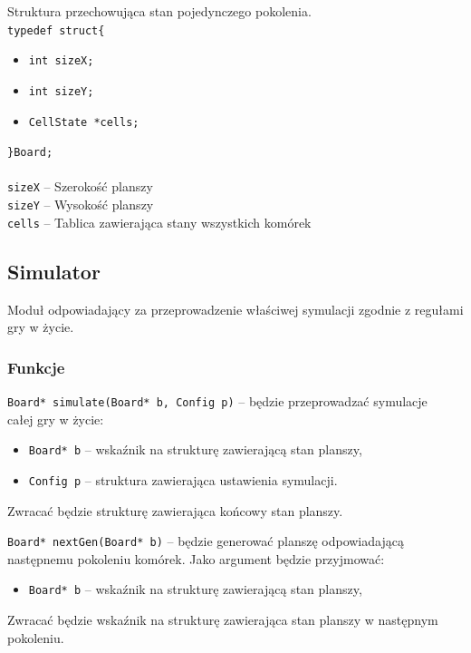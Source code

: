 \documentclass{article}
\begin{document}
\vspace{5mm}

\noindent{}Struktura przechowująca stan pojedynczego pokolenia. \\
\texttt{typedef struct\{}
\begin{itemize}[label={}, noitemsep, topsep=0pt]
	\item \texttt{int sizeX;}
	\item \texttt{int sizeY;}
	\item \texttt{CellState *cells;}
\end{itemize}
\texttt{\}Board;\\} \\
\texttt{sizeX} -- Szerokość planszy \\
\texttt{sizeY} -- Wysokość planszy \\
\texttt{cells} -- Tablica zawierająca stany wszystkich komórek


\subsection{Simulator}
Moduł odpowiadający za przeprowadzenie właściwej symulacji zgodnie z regułami gry w życie.

\subsubsection{Funkcje}
\texttt{Board* simulate(Board* b, Config p)} -- będzie przeprowadzać symulacje\\ całej gry w życie:
\begin{itemize}[label={}]
	\item \texttt{Board* b} -- wskaźnik na strukturę zawierającą stan planszy,
	\item \texttt{Config p} -- struktura zawierająca ustawienia symulacji.
\end{itemize}
Zwracać będzie strukturę zawierająca końcowy stan planszy.

\vspace{5mm}

\noindent{}\texttt{Board* nextGen(Board* b)} -- będzie generować planszę odpowiadającą następnemu pokoleniu komórek. Jako argument będzie przyjmować:
\begin{itemize}[label={}]
	\item \texttt{Board* b} -- wskaźnik na strukturę zawierającą stan planszy,
\end{itemize}
Zwracać będzie wskaźnik na strukturę zawierająca stan planszy w następnym pokoleniu.
\end{document}

